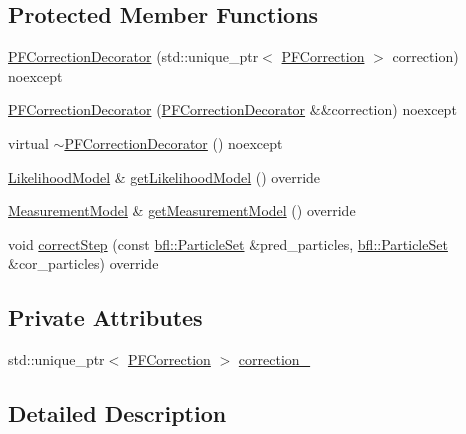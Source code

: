 \subsection*{Protected Member Functions}
\begin{DoxyCompactItemize}
\item 
\mbox{\hyperlink{classbfl_1_1PFCorrectionDecorator_af8114c391487685cc3187ac314a5e236}{P\+F\+Correction\+Decorator}} (std\+::unique\+\_\+ptr$<$ \mbox{\hyperlink{classbfl_1_1PFCorrection}{P\+F\+Correction}} $>$ correction) noexcept
\item 
\mbox{\hyperlink{classbfl_1_1PFCorrectionDecorator_a5cefe8664c7879daf5ce6679436d33a5}{P\+F\+Correction\+Decorator}} (\mbox{\hyperlink{classbfl_1_1PFCorrectionDecorator}{P\+F\+Correction\+Decorator}} \&\&correction) noexcept
\item 
virtual \mbox{\hyperlink{classbfl_1_1PFCorrectionDecorator_a2662b107e2199b27f84ff4da9e188915}{$\sim$\+P\+F\+Correction\+Decorator}} () noexcept
\item 
\mbox{\hyperlink{classbfl_1_1LikelihoodModel}{Likelihood\+Model}} \& \mbox{\hyperlink{classbfl_1_1PFCorrectionDecorator_ae58be7d0fedf9b56afb994211fb4ee6a}{get\+Likelihood\+Model}} () override
\item 
\mbox{\hyperlink{classbfl_1_1MeasurementModel}{Measurement\+Model}} \& \mbox{\hyperlink{classbfl_1_1PFCorrectionDecorator_a3d5b289a95cf6623922153b469755e80}{get\+Measurement\+Model}} () override
\item 
void \mbox{\hyperlink{classbfl_1_1PFCorrectionDecorator_a83bb9ac8ba168f99f211973ae634391a}{correct\+Step}} (const \mbox{\hyperlink{classbfl_1_1ParticleSet}{bfl\+::\+Particle\+Set}} \&pred\+\_\+particles, \mbox{\hyperlink{classbfl_1_1ParticleSet}{bfl\+::\+Particle\+Set}} \&cor\+\_\+particles) override
\end{DoxyCompactItemize}
\subsection*{Private Attributes}
\begin{DoxyCompactItemize}
\item 
std\+::unique\+\_\+ptr$<$ \mbox{\hyperlink{classbfl_1_1PFCorrection}{P\+F\+Correction}} $>$ \mbox{\hyperlink{classbfl_1_1PFCorrectionDecorator_ac4a59d72d92138a22ca7894588b54c6a}{correction\+\_\+}}
\end{DoxyCompactItemize}


\subsection{Detailed Description}


